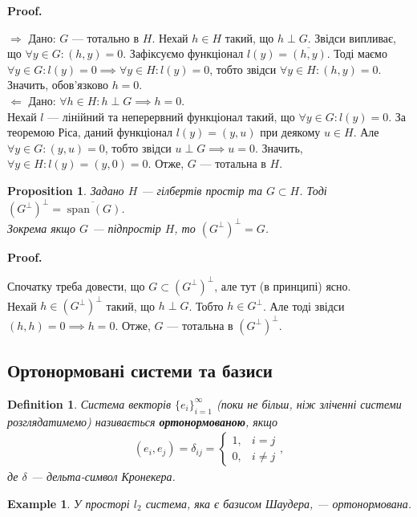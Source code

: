 \documentclass[a4paper, 10pt]{article}
\makeatletter
\def\rightproof{$\boxed{\Rightarrow}$ }
\def\leftproof{$\boxed{\Leftarrow}$ }
\theoremstyle{theoremdd}
\theoremstyle{theoremdd}
\newtheorem{definition}[theorem]{Definition}
\theoremstyle{theoremdd}
\theoremstyle{theoremdd}
\newtheorem{example}[theorem]{Example}
\theoremstyle{theoremdd}
\newtheorem{proposition}[theorem]{Proposition}
\theoremstyle{theoremdd}
\theoremstyle{theoremdd}
\theoremstyle{theoremdd}
\renewenvironment{proof}[1][Proof.\\]{\par
\pushQED{\hfill \qed}%
\normalfont \topsep6\p@\@plus6\p@\relax
\trivlist
\item\relax
{\bfseries
#1\@addpunct{.}}\hspace\labelsep\ignorespaces
}{%
\popQED\endtrivlist\@endpefalse
}
\DeclareMathOperator{\linspan}{span}
\makeatother
\begin{document}
\begin{proof}
\rightproof Дано: $G$ --- тотально в $H$. Нехай $h \in H$ такий, що $h \perp G$. Звідси випливає, що $\forall y \in G: (h,y) = 0$. Зафіксуємо функціонал $l(y) = \overline{(h,y)}$. Тоді маємо $\forall y \in G: l(y) = 0 \implies \forall y \in H: l(y) = 0$, тобто звідси $\forall y \in H: (h,y) = 0$. Значить, обов'язково $h = 0$.
\bigskip \\
\leftproof Дано: $\forall h \in H: h \perp G \implies h = 0$.\\
Нехай $l$ --- лінійний та неперервний функціонал такий, що $\forall y \in G: l(y) = 0$. За теоремою Ріса, даний функціонал $l(y) = (y,u)$ при деякому $u \in H$. Але $\forall y \in G: (y,u) = 0$, тобто звідси $u \perp G \implies u = 0$. Значить, $\forall y \in H: l(y) = (y,0) = 0$. Отже, $G$ --- тотальна в $H$.
\end{proof}

\begin{proposition}
Задано $H$ --- гілбертів простір та $G \subset H$. Тоді $(G^\perp)^\perp = \overline{\linspan(G)}$.\\
Зокрема якщо $G$ --- підпростір $H$, то $(G^\perp)^\perp = G$.
\end{proposition}

\begin{proof}
Спочатку треба довести, що $G \subset (G^\perp)^{\perp}$, але тут (в принципі) ясно.\\
Нехай $h \in (G^\perp)^\perp$ такий, що $h \perp G$. Тобто $h \in G^\perp$. Але тоді звідси $(h,h) = 0 \implies h = 0$. Отже, $G$ --- тотальна в $(G^\perp)^\perp$.
\end{proof}

\subsection{Ортонормовані системи та базиси}
\begin{definition}
Система векторів $\{e_i\}_{i=1}^\infty$ (поки не більш, ніж зліченні системи розглядатимемо) називається \textbf{ортонормованою}, якщо
\begin{align*}
(e_i,e_j) = \delta_{ij} = \begin{cases} 1,& i = j \\ 0, & i \neq j \end{cases},
\end{align*}
де $\delta$ --- дельта-символ Кронекера.
\end{definition}

\begin{example}
У просторі $l_2$ система, яка є базисом Шаудера, --- ортонормована.
\end{example}
\end{document}
